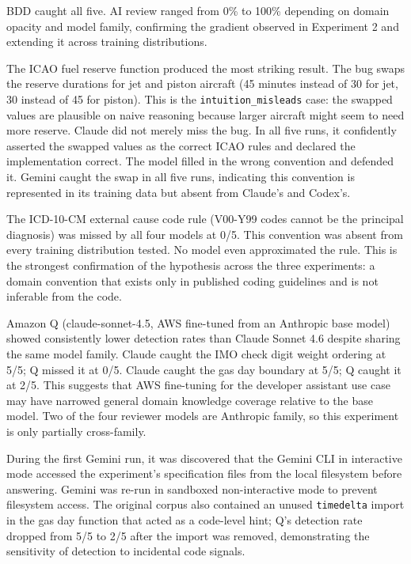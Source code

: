 \documentclass{article}
\begin{document}
BDD caught all five. AI review ranged from 0\% to 100\% depending on domain
opacity and model family, confirming the gradient observed in Experiment 2
and extending it across training distributions.

The ICAO fuel reserve function produced the most striking result. The bug
swaps the reserve durations for jet and piston aircraft (45 minutes instead
of 30 for jet, 30 instead of 45 for piston). This is the
\texttt{intuition\_misleads} case: the swapped values are plausible on naive
reasoning because larger aircraft might seem to need more reserve. Claude
did not merely miss the bug. In all five runs, it confidently asserted the
swapped values as the correct ICAO rules and declared the implementation
correct. The model filled in the wrong convention and defended it. Gemini
caught the swap in all five runs, indicating this convention is represented
in its training data but absent from Claude's and Codex's.

The ICD-10-CM external cause code rule (V00-Y99 codes cannot be the
principal diagnosis) was missed by all four models at 0/5. This convention
was absent from every training distribution tested. No model even
approximated the rule. This is the strongest confirmation of the hypothesis
across the three experiments: a domain convention that exists only in
published coding guidelines and is not inferable from the code.

Amazon Q (claude-sonnet-4.5, AWS fine-tuned from an Anthropic base model)
showed consistently lower detection rates than Claude Sonnet 4.6 despite
sharing the same model family. Claude caught the IMO check digit weight
ordering at 5/5; Q missed it at 0/5. Claude caught the gas day boundary at
5/5; Q caught it at 2/5. This suggests that AWS fine-tuning for the
developer assistant use case may have narrowed general domain knowledge
coverage relative to the base model. Two of the four reviewer models are
Anthropic family, so this experiment is only partially cross-family.

During the first Gemini run, it was discovered that the Gemini CLI in
interactive mode accessed the experiment's specification files from the
local filesystem before answering. Gemini was re-run in sandboxed
non-interactive mode to prevent filesystem access. The original corpus also
contained an unused \texttt{timedelta} import in the gas day function that acted
as a code-level hint; Q's detection rate dropped from 5/5 to 2/5 after
the import was removed, demonstrating the sensitivity of detection to
incidental code signals.
\end{document}
